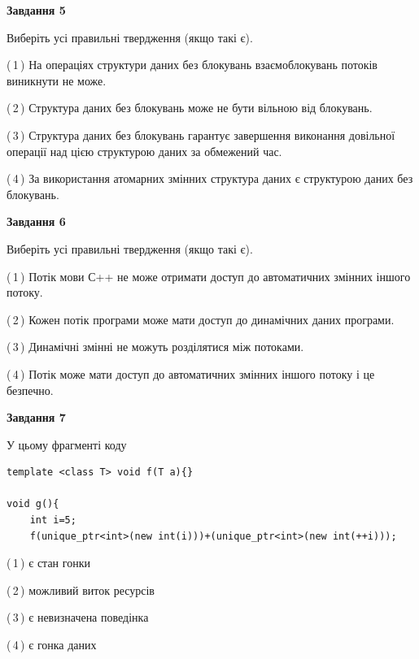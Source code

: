 \documentclass[12pt, ukrainian]{article}
\begin{document}
\begin {large}
{\begin{center}
\textbf{Завдання 5}
\end{center}

Виберіть усі правильні твердження (якщо такі є).\par
\vspace{2mm}

(\,1\,) На операціях структури даних без блокувань взаємоблокувань потоків виникнути не може.%

(\,2\,) Структура даних без блокувань може не бути вільною від блокувань.%

(\,3\,) Структура даних без блокувань гарантує завершення виконання довільної операції над цією структурою даних за обмежений час.%

(\,4\,) За використання атомарних змінних структура даних є структурою даних без блокувань.%
\newpage


\begin{center}
\textbf{Завдання 6}
\end{center}

Виберіть усі правильні твердження (якщо такі є).\par
\vspace{2mm}

(\,1\,) Потік мови С++ не може отримати доступ до автоматичних змінних іншого потоку.%

(\,2\,) Кожен потік програми може мати доступ до динамічних даних програми.%

(\,3\,) Динамічні змінні не можуть розділятися між потоками.%

(\,4\,) Потік може мати доступ до автоматичних змінних іншого потоку і це безпечно.%


\begin{center}
\textbf{Завдання 7}
\end{center}

У цьому фрагменті коду
\begin{verbatim}
template <class T> void f(T a){}

void g(){
    int i=5;
    f(unique_ptr<int>(new int(i)))+(unique_ptr<int>(new int(++i)));
\end{verbatim}
(\,1\,) є стан гонки%

(\,2\,) можливий виток ресурсів%

(\,3\,) є невизначена поведінка%

(\,4\,) є гонка даних%

}
\end {large}

\vspace{4mm}
\newpage
\end{document}
